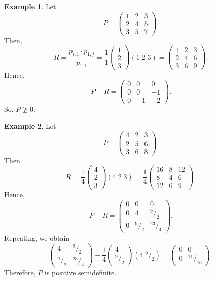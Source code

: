 \documentclass[12pt]{article}
\theoremstyle{definition}
\newtheorem*{example}{Example}
\begin{document}
\begin{example}
Let
\[
P = \begin{pmatrix} 1 & 2 & 3 \\ 2 & 4 & 5 \\ 3 & 5 & 7 \end{pmatrix}.
\]
Then,
\[
R = \frac{p_{i,1} \cdot p_{1,j}}{p_{1,1}} = \frac{1}{1}\begin{pmatrix} 1 \\ 2 \\ 3 \end{pmatrix}(1\;2\;3) = \begin{pmatrix} 1 & 2 & 3 \\ 2 & 4 & 6 \\ 3 & 6 & 9 \end{pmatrix}.
\]
Hence,
\[
P - R = \begin{pmatrix} 0 & 0 & 0 \\ 0 & 0 & -1 \\ 0 & -1 & -2 \end{pmatrix}.
\]
So, $P \not\geq 0$.
\end{example}

\begin{example}
Let
\[
P = \begin{pmatrix} 4 & 2 & 3 \\ 2 & 5 & 6 \\ 3 & 6 & 8 \end{pmatrix}.
\]
Then
\[
R = \frac{1}{4}\begin{pmatrix} 4 \\ 2 \\ 3 \end{pmatrix}(4\;2\;3) = \frac{1}{4}\begin{pmatrix} 16 & 8 & 12 \\ 8 & 4 & 6 \\ 12 & 6 & 9 \end{pmatrix}.
\]
Hence,
\[
P - R = \begin{pmatrix} 0 & 0 & 0 \\ 0 & 4 & {}^9\!/_2 \\ 0 & {}^9\!/_2 & {}^{23}\!/_4 \end{pmatrix}.
\]
Repeating, we obtain
\[
\begin{pmatrix} 4 & {}^9\!/_2 \\ {}^9\!/_2 & {}^{23}\!/_4 \end{pmatrix} - \frac{1}{4}\begin{pmatrix} 4 \\ {}^9\!/_2 \end{pmatrix}(4\;{}^9\!/_2) = \begin{pmatrix} 0 & 0 \\ 0 & {}^{11}\!/_{16} \end{pmatrix}.
\]
Therefore, $P$ is positive semidefinite.
\end{example}
\end{document}
